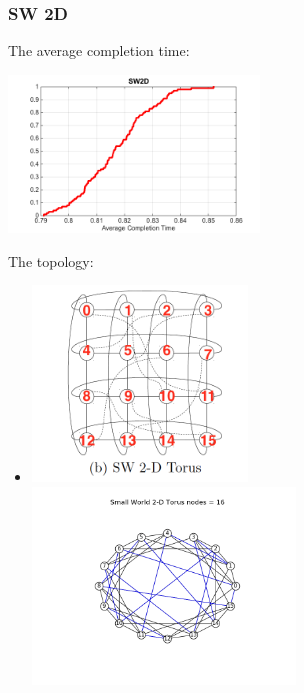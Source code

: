 \documentclass[11pt]{article}
\begin{document}
\subsubsection{SW 2D}
The average completion time: \\
\centerline{\includegraphics[width=0.5\textwidth]{figure/picture/SW2D.png}}
The topology:
\begin{itemize}
	\item \centerline{}
	\includegraphics[width=0.45\textwidth]{figure/draw/SW2D_original}
	\includegraphics[width=0.55\textwidth]{figure/draw/SW2D.png}
\end{itemize}
\end{document}
